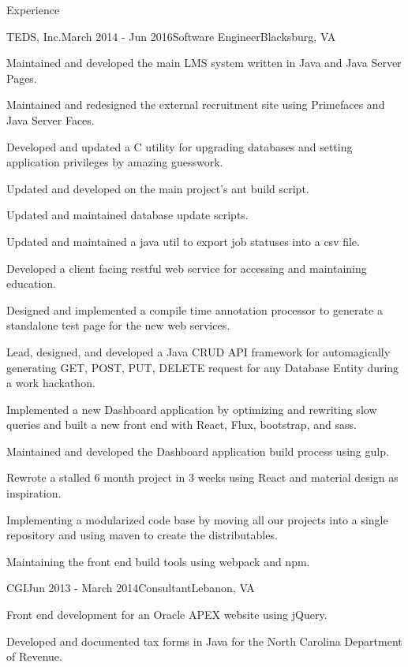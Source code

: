 \documentclass{resume} %
\begin{document}
\begin{rSection}{Experience}
	\begin{rSubsection}{TEDS, Inc.}{March 2014 - Jun 2016}{Software Engineer}{Blacksburg, VA}
		\item Maintained and developed the main LMS system written in Java and Java Server Pages.
		\item Maintained and redesigned the external recruitment site using Primefaces and Java Server Faces.
		\item Developed and updated a C utility for upgrading databases and setting application privileges by amazing guesswork.
		\item Updated and developed on the main project's ant build script.
		\item Updated and maintained database update scripts.
		\item Updated and maintained a java util to export job statuses into a csv file.
		\item Developed a client facing restful web service for accessing and maintaining education.
		\item Designed and implemented a compile time annotation processor to generate a standalone test page for the new web services.
		\item Lead, designed, and developed a Java CRUD API framework for automagically generating GET, POST, PUT, DELETE request for any Database Entity during a work hackathon.
		\item Implemented a new Dashboard application by optimizing and rewriting slow queries and built a new front end with React, Flux, bootstrap, and sass.
		\item Maintained and developed the Dashboard application build process using gulp.
		\item Rewrote a stalled 6 month project in 3 weeks using React and material design as inspiration.
		\item Implementing a modularized code base by moving all our projects into a single repository and using maven to create the distributables.
		\item Maintaining the front end build tools using webpack and npm.
	\end{rSubsection}


	\begin{rSubsection}{CGI}{Jun 2013 - March 2014}{Consultant}{Lebanon, VA}
		\item Front end development for an Oracle APEX website using jQuery.
		\item Developed and documented tax forms in Java for the North Carolina Department of Revenue.
	\end{rSubsection}


\end{rSection}
\end{document}
